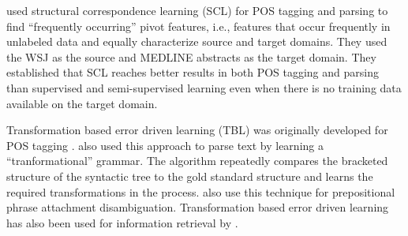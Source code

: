  used structural correspondence learning (SCL) for POS tagging and parsing to find ``frequently occurring'' pivot features, i.e., features that occur frequently in unlabeled data and equally characterize source and target domains. They used the WSJ as the source and MEDLINE abstracts as the target domain. They established that SCL reaches better results in both POS tagging and parsing than supervised and semi-supervised learning even when there is no training data available on the target domain. %

Transformation based error driven learning (TBL) was originally developed for POS tagging \cite{brill1992simple,Brill:1995:TEL:218355.218367}.
\citet{brill1993automatic} also used this approach to parse text by learning a ``tranformational'' grammar. The algorithm repeatedly compares the bracketed structure of the syntactic tree to the gold standard structure and learns the required transformations in the process. \citet{brill1994rule} also use this technique for prepositional phrase attachment disambiguation.
Transformation based error driven learning has also been used for information retrieval by \citet{woodley2005applying}.

